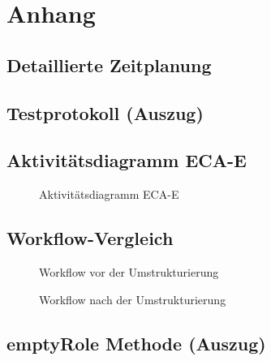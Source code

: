 \section{Anhang}
\subsection{Detaillierte Zeitplanung}
\label{app:Zeitplanung}


\subsection{Testprotokoll (Auszug)}
\label{app:IssueLog}




\clearpage

\subsection{Aktivitätsdiagramm ECA-E}
\begin{figure}[htb]
    \centering
    \label{Aktivitaetsdiagramm}
    \caption{Aktivitätsdiagramm ECA-E}
\end{figure}
\clearpage

\subsection{Workflow-Vergleich}
\label{WorkflowVergleich}

\begin{figure}[htb]
    \caption{Workflow vor der Umstrukturierung}
    \label{WorkflowVergleich1}
\end{figure}

\begin{figure}[htb]
    \caption{Workflow nach der Umstrukturierung}
    \label{WorkflowVergleich2}
\end{figure}

\subsection{emptyRole Methode (Auszug)}
\label{EmptyRoleMethode}




\clearpage